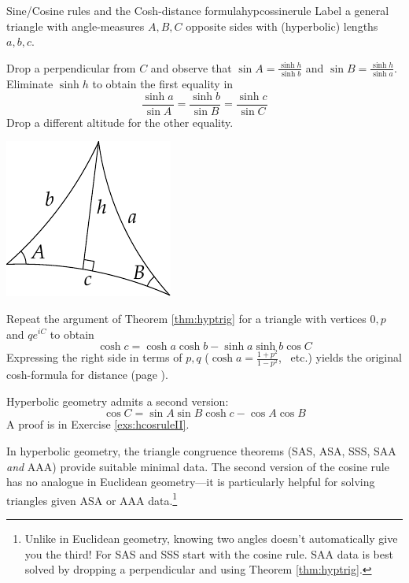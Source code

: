 \begin{cor}{Sine/Cosine rules and the Cosh-distance formula}{hypcossinerule}
	Label a general triangle with angle-measures $A,B,C$ opposite sides with (hyperbolic) lengths $a,b,c$.
	\begin{description}
		\begin{minipage}[t]{0.74\linewidth}\vspace{-8pt}
			\item[Sine Rule] Drop a perpendicular from $C$ and observe that $\sin A=\frac{\sinh h}{\sinh b}$ and $\sin B=\frac{\sinh h}{\sinh a}$. Eliminate $\sinh h$ to obtain the first equality in
			\[
				\frac{\sinh a}{\sin A}=\frac{\sinh b}{\sin B}=\frac{\sinh c}{\sin C}
			\]
			Drop a different altitude for the other equality.
		\end{minipage}
		\hfill
		\begin{minipage}[t]{0.25\linewidth}\vspace{-15pt}
			\flushright\includegraphics[scale=0.95]{isom-sine}
		\end{minipage}\par
			
		\item[Cosine Rule I] Repeat the argument of Theorem \ref{thm:hyptrig} for a triangle with vertices $0,p$ and $qe^{iC}$ to obtain
		\[
			\cosh c=\cosh a\cosh b-\sinh a\sinh b\cos C
		\]
		Expressing the right side in terms of $p,q$ ($\cosh a=\frac{1+p^2}{1-p^2}$, \ etc.) yields the original cosh-formula for distance (page \pageref{lemm:distformula}).
		\item[Cosine Rule II] Hyperbolic geometry admits a second version:
		\[
			\cos C=\sin A\sin B\cosh c-\cos A\cos B
		\]
		A proof is in Exercise \ref{exs:hcosruleII}.
	\end{description}
\end{cor}


In hyperbolic geometry, the triangle congruence theorems (SAS, ASA, SSS, SAA \emph{and} AAA) provide suitable minimal data. The second version of the cosine rule has no analogue in Euclidean geometry---it is particularly helpful for solving triangles given ASA or AAA data.\footnote{%
	Unlike in Euclidean geometry, knowing two angles doesn't automatically give you the third! For SAS and SSS start with the cosine rule. SAA data is best solved by dropping a perpendicular and using Theorem \ref{thm:hyptrig}.%
}



